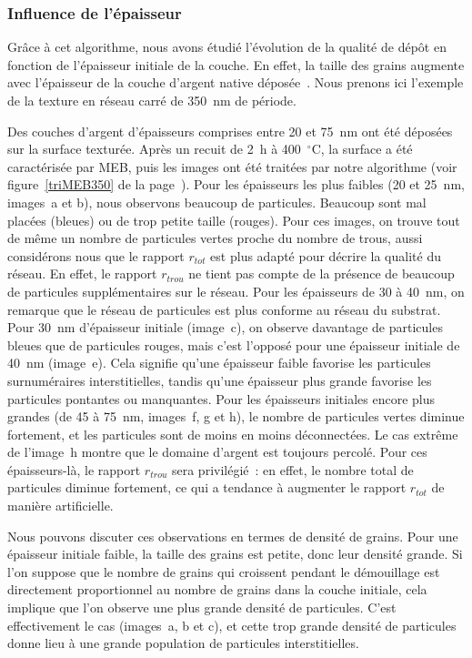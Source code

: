 	\subsubsection{Influence de l'épaisseur}
Grâce à cet algorithme, nous avons étudié l'évolution de la qualité de dépôt en fonction de l'épaisseur initiale de la couche. En effet, la taille des grains augmente avec l'épaisseur de la couche d'argent native déposée~\cite{hillert1965theory, thompson1990grain}. Nous prenons ici l'exemple de la texture en réseau carré de 350~nm de période.\par 
Des couches d'argent d'épaisseurs comprises entre 20 et 75~nm ont été déposées sur la surface texturée. Après un recuit de 2~h à 400~$^\circ$C, la surface a été caractérisée par MEB, puis les images ont été traitées par notre algorithme (voir figure~\ref{triMEB350} de la page~\pageref{triMEB350}). Pour les épaisseurs les plus faibles (20 et 25~nm, images~a et b), nous observons beaucoup de particules. Beaucoup sont mal placées (bleues) ou de trop petite taille (rouges). Pour ces images, on trouve tout de même un nombre de particules vertes proche du nombre de trous, aussi considérons nous que le rapport $r_{tot}$ est plus adapté pour décrire la qualité du réseau. En effet, le rapport $r_{trou}$ ne tient pas compte de la présence de beaucoup de particules supplémentaires sur le réseau. Pour les épaisseurs de 30 à 40~nm, on remarque que le réseau de particules est plus conforme au réseau du substrat. Pour 30~nm d'épaisseur initiale (image~c), on observe davantage de particules bleues que de particules rouges, mais c'est l'opposé pour une épaisseur initiale de 40~nm (image~e). Cela signifie qu'une épaisseur faible favorise les particules surnuméraires interstitielles, tandis qu'une épaisseur plus grande favorise les particules pontantes ou manquantes. Pour les épaisseurs initiales encore plus grandes (de 45 à 75~nm, images~f, g et h), le nombre de particules vertes diminue fortement, et les particules sont de moins en moins déconnectées. Le cas extrême de l'image~h montre que le domaine d'argent est toujours percolé. Pour ces épaisseurs-là, le rapport $r_{trou}$ sera privilégié~: en effet, le nombre total de particules diminue fortement, ce qui a tendance à augmenter le rapport $r_{tot}$ de manière artificielle.\par 
Nous pouvons discuter ces observations en termes de densité de grains. Pour une épaisseur initiale faible, la taille des grains est petite, donc leur densité grande. Si l'on suppose que le nombre de grains qui croissent pendant le démouillage est directement proportionnel au nombre de grains dans la couche initiale, cela implique que l'on observe une plus grande densité de particules. C'est effectivement le cas (images~a, b et c), et cette trop grande densité de particules donne lieu à une grande population de particules interstitielles.\par 
